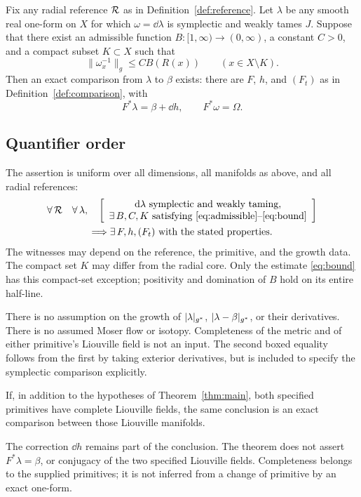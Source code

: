 \begin{theorem}\label{thm:main}
Fix any radial reference $\mathcal R$ as in Definition~\ref{def:reference}.
Let $\lambda$ be any smooth real one-form on $X$ for which
$\omega=\dd\lambda$ is symplectic and weakly tames $J$.
Suppose that there exist an admissible function
$B:[1,\infty)\to(0,\infty)$, a constant $C>0$, and a compact
subset $K\subset X$ such that
\begin{equation}\label{eq:bound}
 \|\omega_x^{-1}\|_g\le C B(R(x))
 \qquad (x\in X\setminus K).
\end{equation}
Then an exact comparison from $\lambda$ to $\beta$ exists:
there are $F$, $h$, and $(F_t)$ as in Definition~\ref{def:comparison},
with
\[
 \boxed{\ F^*\lambda=\beta+\dd h,\qquad F^*\omega=\Omega.\ }
\]
\end{theorem}

\subsection{Quantifier order}
The assertion is uniform over all dimensions, all manifolds as above,
and all radial references:
\[
\begin{gathered}
 \forall\,\mathcal R\quad\forall\,\lambda,\quad
 \left[
 \begin{array}{c}
 \mathrm d\lambda\text{ symplectic and weakly taming},\\
 \exists\,B,C,K\text{ satisfying \eqref{eq:admissible}--\eqref{eq:bound}}
 \end{array}\right]\\
 \Longrightarrow
 \exists\,F,h,(F_t)\text{ with the stated properties}.
\end{gathered}
\]
The witnesses may depend on the reference, the primitive, and the
growth data. The compact set $K$ may differ from the radial core.
Only the estimate \eqref{eq:bound} has this compact-set exception;
positivity and domination of $B$ hold on its entire half-line.

There is no assumption on the growth of $|\lambda|_{g^*}$,
$|\lambda-\beta|_{g^*}$, or their derivatives. There is no
assumed Moser flow or isotopy. Completeness of the metric and of
either primitive's Liouville field is not an input.
The second boxed equality follows from the first by taking exterior
derivatives, but is included to specify the symplectic comparison
explicitly.

\begin{corollary}\label{cor:complete}
If, in addition to the hypotheses of Theorem~\ref{thm:main}, both
specified primitives have complete Liouville fields, the same
conclusion is an exact comparison between those Liouville manifolds.
\end{corollary}
The correction $\dd h$ remains part of the conclusion. The theorem
does not assert $F^*\lambda=\beta$, or conjugacy of the two specified
Liouville fields. Completeness belongs to the supplied primitives;
it is not inferred from a change of primitive by an exact one-form.

